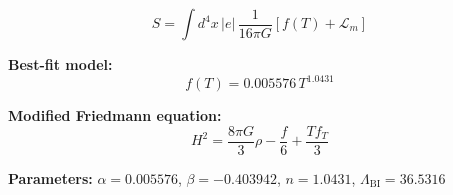 
\begin{equation}
  S = \int d^4x \, |e| \, \frac{1}{16\pi G} \left[ f(T) + \mathcal{L}_m \right]
\end{equation}

\textbf{Best-fit model:}
\begin{equation}
  f(T) = 0.005576 \, T^{1.0431}
\end{equation}

\textbf{Modified Friedmann equation:}
\begin{equation}
  H^2 = \frac{8\pi G}{3} \rho - \frac{f}{6} + \frac{T f_T}{3}
\end{equation}

\textbf{Parameters:}
$\alpha = 0.005576$, \quad
$\beta = -0.403942$, \quad
$n = 1.0431$, \quad
$\Lambda_{\text{BI}} = 36.5316$